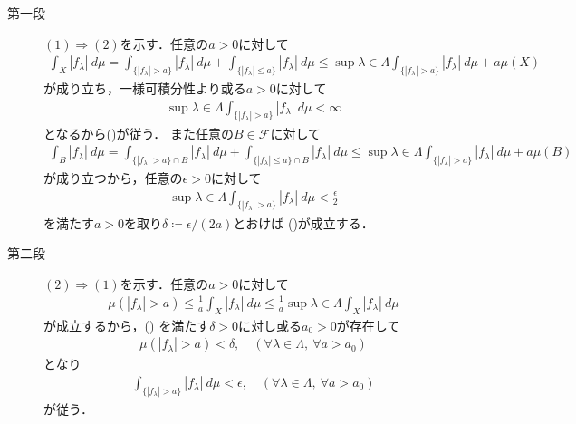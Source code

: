 	\begin{prf}\mbox{}
		\begin{description}
			\item[第一段]
				$(1) \Rightarrow (2)$を示す．任意の$a > 0$に対して
				\begin{align}
					\int_X |f_\lambda|\ d\mu
					= \int_{\{|f_\lambda|>a\}} |f_\lambda|\ d\mu
						+ \int_{\{|f_\lambda| \leq a\}} |f_\lambda|\ d\mu
					\leq \sup{\lambda \in \Lambda}\int_{\{|f_\lambda|>a\}} |f_\lambda|\ d\mu
						+ a\mu(X)
				\end{align}
				が成り立ち，一様可積分性より或る$a > 0$に対して
				\begin{align}
					\sup{\lambda \in \Lambda}\int_{\{|f_\lambda|>a\}} |f_\lambda|\ d\mu < \infty
				\end{align}
				となるから()が従う．
				また任意の$B \in \mathscr{F}$に対して
				\begin{align}
					\int_B |f_\lambda|\ d\mu
					= \int_{\{|f_\lambda|>a\} \cap B} |f_\lambda|\ d\mu
						+ \int_{\{|f_\lambda| \leq a\} \cap B} |f_\lambda|\ d\mu
					\leq \sup{\lambda \in \Lambda}\int_{\{|f_\lambda|>a\}} |f_\lambda|\ d\mu
						+ a\mu(B)
				\end{align}
				が成り立つから，任意の$\epsilon > 0$に対して
				\begin{align}
					\sup{\lambda \in \Lambda}\int_{\{|f_\lambda|>a\}} |f_\lambda|\ d\mu < \frac{\epsilon}{2}
				\end{align}
				を満たす$a > 0$を取り$\delta \coloneqq \epsilon/(2a)$とおけば
				()が成立する．
				
			\item[第二段]
				$(2) \Rightarrow (1)$を示す．任意の$a > 0$に対して
				\begin{align}
					\mu(|f_\lambda| > a) \leq \frac{1}{a} \int_X |f_\lambda|\ d\mu
					\leq \frac{1}{a}\sup{\lambda \in \Lambda}{\int_X|f_\lambda|\ d\mu}
				\end{align}
				が成立するから，()
				を満たす$\delta > 0$に対し或る$a_0 > 0$が存在して
				\begin{align}
					\mu(|f_\lambda| > a) < \delta,
					\quad (\forall \lambda \in \Lambda,\ \forall a > a_0)
				\end{align}
				となり
				\begin{align}
					\int_{\{|f_\lambda|>a\}} |f_\lambda|\ d\mu < \epsilon,
					\quad (\forall \lambda \in \Lambda,\ \forall a > a_0)
				\end{align}
				が従う．
				\QED
		\end{description}
	\end{prf}
	
